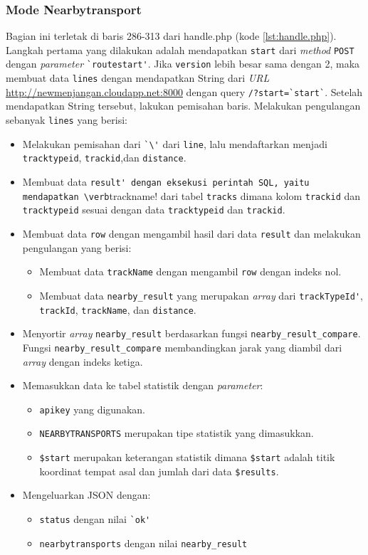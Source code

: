 \subsubsection{Mode Nearbytransport}
Bagian ini terletak di baris 286-313 dari handle.php (kode \ref{lst:handle.php}). Langkah pertama yang dilakukan adalah mendapatkan \verb!start! dari \textit{method} \verb!POST! dengan \textit{parameter} \verb!`routestart'!. Jika \verb!version! lebih besar sama dengan 2, maka membuat data \verb!lines! dengan mendapatkan String dari \textit{URL} \url{http://newmenjangan.cloudapp.net:8000} dengan query \verb!/?start=`start`!. Setelah mendapatkan String tersebut, lakukan pemisahan baris. Melakukan pengulangan sebanyak \verb!lines! yang berisi:
\begin{itemize}
	\item Melakukan pemisahan dari \verb!`\'! dari \verb!line!, lalu mendaftarkan menjadi  \verb!tracktypeid!, \verb!trackid!,dan \verb!distance!.
	\item Membuat data \verb!result' dengan eksekusi perintah SQL, yaitu mendapatkan \verb!trackname! dari tabel \verb!tracks! dimana kolom \verb!trackid! dan \verb!tracktypeid! sesuai dengan data \verb!tracktypeid! dan \verb!trackid!.
	\item Membuat data \verb!row! dengan mengambil hasil dari data \verb!result! dan melakukan pengulangan yang berisi:
	\begin{itemize}
		\item Membuat data \verb!trackName! dengan mengambil \verb!row! dengan indeks nol.
		\item Membuat data \verb!nearby_result! yang merupakan \textit{array} dari \verb!trackTypeId'!, \verb!trackId!, \verb!trackName!, dan \verb!distance!.
	\end{itemize}
	\item Menyortir \textit{array} \verb!nearby_result! berdasarkan fungsi \verb!nearby_result_compare!. Fungsi \verb!nearby_result_compare! membandingkan jarak yang diambil dari \textit{array} dengan indeks ketiga.
	\item Memasukkan data ke tabel statistik dengan \textit{parameter}:
	\begin{itemize}
		\item \verb!apikey! yang digunakan.
		\item \verb!NEARBYTRANSPORTS! merupakan tipe statistik yang dimasukkan.
		\item \verb!$start! merupakan keterangan statistik dimana \verb!$start! adalah titik koordinat tempat asal dan jumlah dari data \verb!$results!.
	\end{itemize}
	\item Mengeluarkan JSON dengan:
\begin{itemize}
			\item \verb!status! dengan nilai \verb!`ok'!
			\item \verb!nearbytransports! dengan nilai \verb!nearby_result!
\end{itemize} 
	
\end{itemize}

